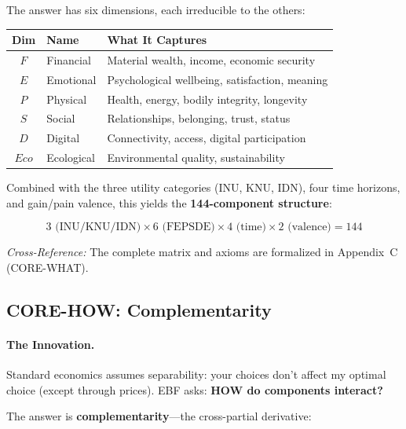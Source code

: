 The answer has six dimensions, each irreducible to the others:

\begin{center}
\renewcommand{\arraystretch}{1.2}
\begin{tabular}{@{}cll@{}}
\toprule
\textbf{Dim} & \textbf{Name} & \textbf{What It Captures} \\
\midrule
$F$ & Financial & Material wealth, income, economic security \\
$E$ & Emotional & Psychological wellbeing, satisfaction, meaning \\
$P$ & Physical & Health, energy, bodily integrity, longevity \\
$S$ & Social & Relationships, belonging, trust, status \\
$D$ & Digital & Connectivity, access, digital participation \\
$Eco$ & Ecological & Environmental quality, sustainability \\
\bottomrule
\end{tabular}
\end{center}

Combined with the three utility categories (INU, KNU, IDN), four time horizons,
and gain/pain valence, this yields the \textbf{144-component structure}:

\begin{equation}
3 \text{ (INU/KNU/IDN)} \times 6 \text{ (FEPSDE)} \times 4 \text{ (time)} \times 2 \text{ (valence)} = 144
\end{equation}

\textit{Cross-Reference:} The complete matrix and axioms are formalized in
Appendix~C (CORE-WHAT).

\subsection{CORE-HOW: Complementarity}
\label{sec:10c-how}

\paragraph{The Innovation.}
Standard economics assumes separability: your choices don't affect my optimal
choice (except through prices). EBF asks: \textbf{HOW do components interact?}

The answer is \textbf{complementarity}---the cross-partial derivative:

